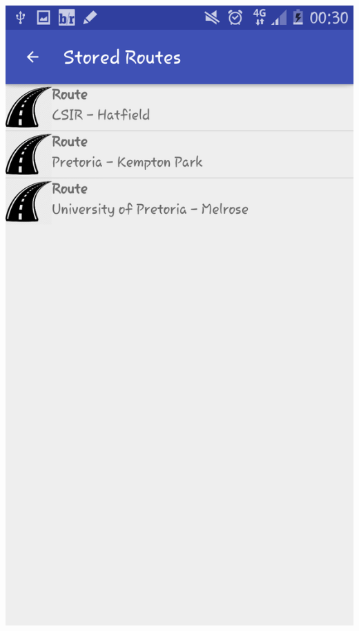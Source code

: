 \documentclass[a4paper,12pt]{article}
\begin{document}
\includegraphics[width=\textwidth]{images/StoredRoutes2.png}
\end{document}
